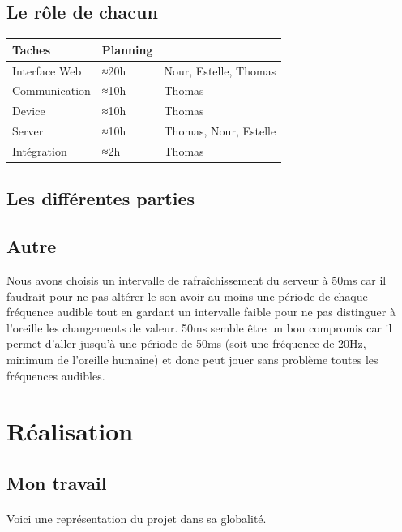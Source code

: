 \documentclass[12pt]{article}
\begin{document}
	\subsection{Le rôle de chacun}
	\noindent
	\begin{tabular}{|p{}|p{}|p{}|}
		\hline
		Taches&Planning&\\\hline
		Interface Web&≈20h&Nour, Estelle, Thomas\\
		Communication&≈10h&Thomas\\
		Device&≈10h&Thomas\\
		Server&≈10h&Thomas, Nour, Estelle\\
		Intégration&≈2h&Thomas\\
		\hline
	\end{tabular}
	\subsection{Les différentes parties}
	
	\subsection{Autre}
	Nous avons choisis un intervalle de rafraîchissement du serveur à 50ms car il faudrait pour ne pas altérer le son avoir au moins une période de chaque fréquence audible tout en gardant un intervalle faible pour ne pas distinguer à l'oreille les changements de valeur. 50ms semble être un bon compromis car il permet d'aller jusqu'à une période de 50ms (soit une fréquence de 20Hz, minimum de l'oreille humaine) et donc peut jouer sans problème toutes les fréquences audibles.
	
	
	\newpage
	\section{Réalisation}
	\subsection{Mon travail}
	\paragraph{}
	Voici une représentation du projet dans sa globalité.
	
\end{document}
